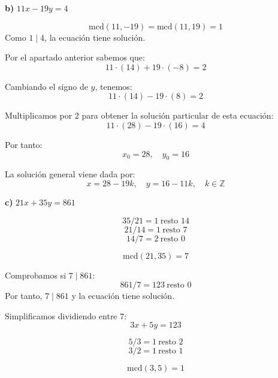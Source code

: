 \documentclass[a4paper,12pt]{article}
\begin{document}
\begin{ejercicio}[title=Ejercicio 9]

\textbf{b) } $11x - 19y = 4$

\vspace{0.5em}

\[
\text{mcd}(11, -19) = \text{mcd}(11, 19) = 1
\]
Como $1 \mid 4$, la ecuación tiene solución.

Por el apartado anterior sabemos que:
\[
11 \cdot (14) + 19 \cdot (-8) = 2
\]

Cambiando el signo de $y$, tenemos:
\[
11 \cdot (14) - 19 \cdot (8) = 2
\]

Multiplicamos por $2$ para obtener la solución particular de esta ecuación:
\[
11 \cdot (28) - 19 \cdot (16) = 4
\]

Por tanto:
\[
x_0 = 28, \quad y_0 = 16
\]

La solución general viene dada por:
\[
\boxed{
x = 28 - 19k, \quad y = 16 - 11k, \quad k \in \mathbb{Z}
}
\]

\textbf{c) } $21x + 35y = 861$

\vspace{0.5em}

\[
35 / 21 = 1 \ \text{resto } 14
\]
\[
21 / 14 = 1 \ \text{resto } \boxed{7}
\]
\[
14 / 7 = 2 \ \text{resto } 0
\]

\[
\text{mcd}(21,35) = 7
\]

Comprobamos si $7 \mid 861$:
\[
861 / 7 = 123 \ \text{resto } 0
\]
Por tanto, $7 \mid 861$ y la ecuación tiene solución.

Simplificamos dividiendo entre $7$:
\[
3x + 5y = 123
\]

\vspace{0.5em}

\[
5 / 3 = 1 \ \text{resto } 2
\]
\[
3 / 2 = 1 \ \text{resto } \boxed{1}
\]

\[
\text{mcd}(3,5) = \boxed{1}
\]

\end{ejercicio}
\end{document}
